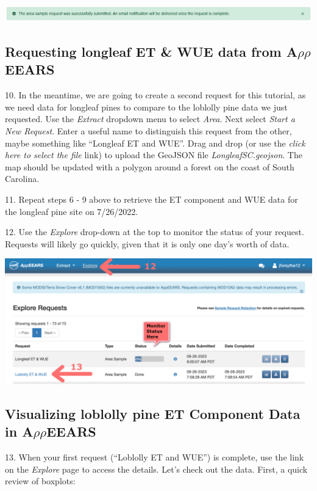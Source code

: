 \documentclass[oneside,a4paper,11pt,explicit]{book}
\begin{document}
\vspace{.5em}

\centerline{\includegraphics[width=\textwidth]{RequestSuccess.png}}

\subsection{Requesting longleaf ET \& WUE data from A$\rho\rho$EEARS}

10. In the meantime, we are going to create a second request for this tutorial, as we need data for longleaf pines to compare to the loblolly pine data we just requested. Use the \textit{Extract} dropdown menu to select \textit{Area}. Next select \textit{Start a New Request}.  Enter a useful name to distinguish this request from the other, maybe something like ``Longleaf ET and WUE''. Drag and drop (or use the \textit{click here to select the file} link) to upload the GeoJSON file \textit{LongleafSC.geojson}. The map should be updated with a polygon around a forest on the coast of South Carolina.

11. Repeat steps 6 - 9 above to retrieve the ET component and WUE data for the longleaf pine site on 7/26/2022.

12. Use the \textit{Explore} drop-down at the top to monitor the status of your request. Requests will likely go quickly, given that it is only one day's worth of data.

\vspace{.5em}

\centerline{\includegraphics[width=.55\textwidth]{ExploreComplete.png}}

\vspace{.5em}

\subsection{Visualizing loblolly pine ET Component Data in A$\rho\rho$EEARS}

13. When your first request (``Loblolly ET and WUE'') is complete, use the link on the \textit{Explore} page to access the details. Let's check out the data. First, a quick review of boxplots:
\end{document}
